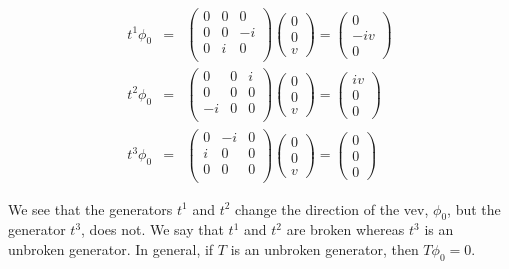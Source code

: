 \begin{eqnarray}
t^1\phi_0 &=& 
\begin{pmatrix}
0 & 0 & 0\\
0 & 0 & -i\\
0 & i & 0\\
\end{pmatrix}\begin{pmatrix}
    0\\
    0\\
    v
\end{pmatrix} =\begin{pmatrix}
    0\\
    -iv\\
    0
\end{pmatrix}\\
t^2\phi_0 &=& 
\begin{pmatrix}
0 & 0 & i\\
0 & 0 & 0\\
-i & 0 & 0\\
\end{pmatrix}\begin{pmatrix}
    0\\
    0\\
    v
\end{pmatrix} =\begin{pmatrix}
    iv\\
    0\\
    0
\end{pmatrix}\\
t^3\phi_0 &=& 
\begin{pmatrix}
0 & -i & 0\\
i & 0 & 0\\
0 & 0 & 0\\
\end{pmatrix}\begin{pmatrix}
    0\\
    0\\
    v
\end{pmatrix} =\begin{pmatrix}
    0\\
    0\\
    0
\end{pmatrix}
\end{eqnarray}

We see that the generators $t^1$ and $t^2$ change the direction of the vev, $\phi_0$, but the generator $t^3$, does not. We say that $t^1$ and $t^2$ are broken whereas $t^3$ is an unbroken generator. In general, if $T$ is an unbroken generator, then $T\phi_0=0$. 

